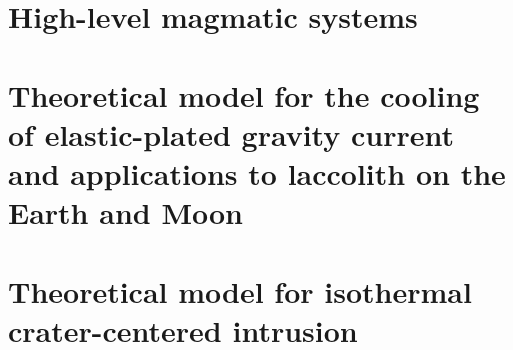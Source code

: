 \documentclass[a4paper,12pt,twoside]{ThesisStyle}
\begin{document}


\dominitoc


\cleardoublepage



\cleardoublepage

\tableofcontents

\mainmatter

\setcounter{chapter}{-1}
\pagestyle{empty}


\part{High-level magmatic systems}
\pagestyle{fancy}




\part{Theoretical  model for  the  cooling  of elastic-plated  gravity
  current and applications to laccolith on the Earth and Moon}





\part{Theoretical model for isothermal crater-centered intrusion}





% 



% 
% 

% 



\end{document}

